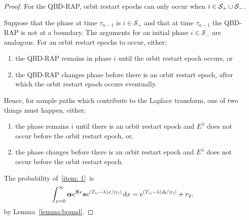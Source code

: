 \begin{proof}
	For the QBD-RAP, orbit restart epochs can only occur when \(i\in\mathcal S_+\cup\mathcal{S}_-\). 
	
	Suppose that the phase at time \(\tau_{n-1}\) is \(i\in\mathcal S_+\) and that at time \(\tau_{n-1}\) the QBD-RAP is not at a boundary. The arguments for an initial phase \(i\in\mathcal S_-\) are analogous. For an orbit restart epochs to occur, either; 
	\begin{enumerate}
		\item the QBD-RAP remains in phase \(i\) until the orbit restart epoch occurs, or
		\item the QBD-RAP changes phase before there is an orbit restart epoch, after which the orbit restart epoch occurs eventually. 
	\end{enumerate}
	
	Hence, for sample paths which contribute to the Laplace transform, one of two things must happen, either; 
	\begin{enumerate}
		\item the phase remains \(i\) until there is an orbit restart epoch and \(E^\lambda\) does not occur before the orbit restart epoch, or, \label{item: 1}
		\item the phase changes before there is an orbit restart epoch and \(E^\lambda\) does not occur before the orbit restart epoch. \label{item: 2}
	\end{enumerate}
	
	The probability of~\ref{item: 1}~is 
	\begin{align}
		\int_{x=0}^\infty \boldsymbol \alpha e^{\boldsymbol{S}x}\boldsymbol s e^{(T_{ii}-\lambda)x/|c_i|}\, \mathrm{d} x 
		&= e^{(T_{ii}-\lambda)\Delta/|c_i|} + r_2,\label{eqn: bnd this 12345}
	\end{align}
	by Lemma~\ref{lemma:bound}.
	

\end{proof}
